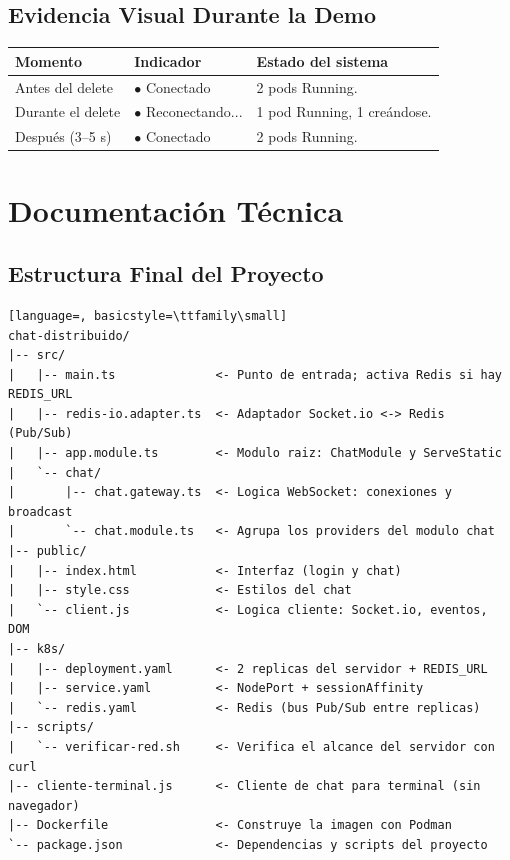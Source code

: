 \documentclass[11pt,a4paper]{article}
\begin{document}
\subsection{Evidencia Visual Durante la Demo}
\renewcommand{\arraystretch}{1.3}
\begin{tabularx}{\linewidth}{l l X}
\toprule
\bfseries Momento & \bfseries Indicador & \bfseries Estado del sistema \\
\midrule
Antes del delete & {\color{verde}$\bullet$ Conectado} & 2 pods Running. \\
Durante el delete & {\color{rojo}$\bullet$ Reconectando...} & 1 pod Running, 1 creándose. \\
Después (3--5 s) & {\color{verde}$\bullet$ Conectado} & 2 pods Running. \\
\bottomrule
\end{tabularx}

\newpage
\section{Documentación Técnica}

\subsection{Estructura Final del Proyecto}
\begin{lstlisting}[language=, basicstyle=\ttfamily\small]
chat-distribuido/
|-- src/
|   |-- main.ts              <- Punto de entrada; activa Redis si hay REDIS_URL
|   |-- redis-io.adapter.ts  <- Adaptador Socket.io <-> Redis (Pub/Sub)
|   |-- app.module.ts        <- Modulo raiz: ChatModule y ServeStatic
|   `-- chat/
|       |-- chat.gateway.ts  <- Logica WebSocket: conexiones y broadcast
|       `-- chat.module.ts   <- Agrupa los providers del modulo chat
|-- public/
|   |-- index.html           <- Interfaz (login y chat)
|   |-- style.css            <- Estilos del chat
|   `-- client.js            <- Logica cliente: Socket.io, eventos, DOM
|-- k8s/
|   |-- deployment.yaml      <- 2 replicas del servidor + REDIS_URL
|   |-- service.yaml         <- NodePort + sessionAffinity
|   `-- redis.yaml           <- Redis (bus Pub/Sub entre replicas)
|-- scripts/
|   `-- verificar-red.sh     <- Verifica el alcance del servidor con curl
|-- cliente-terminal.js      <- Cliente de chat para terminal (sin navegador)
|-- Dockerfile               <- Construye la imagen con Podman
`-- package.json             <- Dependencias y scripts del proyecto
\end{lstlisting}
\end{document}
